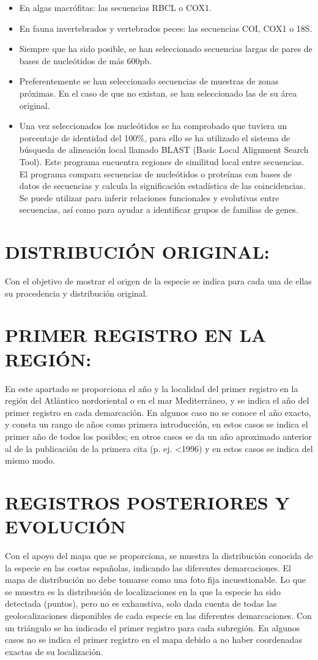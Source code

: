 \documentclass{article}
\begin{document}
\begin{itemize}
\item En algas  macrófitas: las secuencias RBCL o COX1.
\item En fauna invertebrados y vertebrados peces: las secuencias COI, COX1 o 18S. 
\item Siempre que ha sido posible, se han seleccionado secuencias largas de pares de bases de nucleótidos de más 600pb.
\item Preferentemente se han seleccionado secuencias de muestras de zonas próximas. En el caso de que no existan, se han seleccionado las de su área original. 
\item Una vez seleccionados los nucleótidos se ha comprobado que tuviera un porcentaje de identidad del 100\%, para ello se ha utilizado el sistema de búsqueda de alineación local llamado BLAST (Basic Local Alignment Search Tool). Este programa encuentra regiones de similitud local entre secuencias. El programa compara secuencias de nucleótidos o proteínas con bases de datos de secuencias y calcula la significación estadística de las coincidencias. Se puede utilizar para inferir relaciones funcionales y evolutivas entre secuencias, así como para ayudar a identificar grupos de familias de genes. 
\end{itemize}

\section*{DISTRIBUCIÓN ORIGINAL:} 
Con el objetivo de mostrar el origen de la especie se indica para cada una de ellas su procedencia y distribución original. 

\section*{PRIMER REGISTRO EN LA REGIÓN:}
En este apartado se proporciona el año y la localidad del primer registro en la región del Atlántico nordoriental o en el mar Mediterráneo, y se indica el año del primer registro en cada demarcación.  En algunos  caso no se conoce el año exacto, y consta un rango de años como primera introducción, en estos casos se indica el primer año de todos los posibles; en otros casos se da un año aproximado anterior al de la publicación de la primera cita (p. ej. <1996) y en estos casos se indica del mismo modo.

\section*{REGISTROS POSTERIORES Y EVOLUCIÓN}
Con el apoyo del mapa que se proporciona, se muestra  la distribución conocida de la especie en las costas españolas, indicando las diferentes demarcaciones.  El mapa de distribución no debe tomarse como una foto fija incuestionable. Lo que se muestra es la distribución de localizaciones en la que la especie ha sido detectada (puntos), pero no es exhaustiva, solo dada cuenta de todas las geolocalizaciones disponibles de cada especie en las diferentes demarcaciones. Con un triángulo se ha indicado el primer registro para cada subregión. En algunos casos no se indica el  primer registro en el mapa debido a no haber  coordenadas exactas de su localización.
\end{document}
